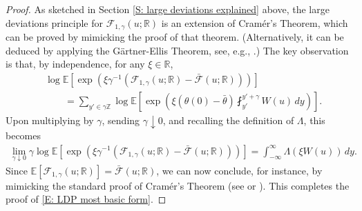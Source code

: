 \documentclass[10pt,a4paper]{amsart}
\newcommand{\E}{\mathbb{E}}
\begin{document}
		\begin{proof} As sketched in Section \ref{S: large deviations explained} above, the large deviations principle for $\mathscr{F}_{1,\gamma}(u;\mathbb{R})$ is an extension of Cram\'{e}r's Theorem, which can be proved by mimicking the proof of that theorem. (Alternatively, it can be deduced by applying the G\"{a}rtner-Ellis Theorem, see, e.g., \cite[Section 12.2]{Rassoul-Agha}.) The key observation is that, by independence, for any $\xi \in \mathbb{R}$,
        \begin{align*}
            & \log \mathbb{E} [ \exp ( \xi \gamma^{-1} ( \mathscr{F}_{1,\gamma}(u;\mathbb{R})  - \bar{\mathscr{F}}(u;\mathbb{R}))) ] \\
            & \qquad = \sum_{y' \in \gamma \mathbb{Z}} \log \mathbb{E} [ \exp ( \xi ( \theta(0) - \bar{\theta} ) \fint_{y'}^{y' + \gamma} W(u) \, dy ) ].
        \end{align*}
Upon multiplying by $\gamma$, sending $\gamma \downarrow 0$, and recalling the definition of $\Lambda$, this becomes
        \begin{align*}
        \lim_{ \gamma \downarrow 0 } \gamma  \log \mathbb{E} [ \exp ( \xi \gamma^{-1} ( \mathscr{F}_{1,\gamma}(u;\mathbb{R})  - \bar{\mathscr{F}}(u;\mathbb{R})) ) ] = \int_{-\infty}^{\infty} \Lambda ( \xi W(u) ) \, dy.
        \end{align*}
       Since $ \E [ \mathscr{F}_{ 1 , \gamma } ( u ; \mathbb{R} ) ] = \bar{\mathscr{F}}(u;\mathbb{R}) $, we can now conclude, for instance, by mimicking the standard proof of Cram\'{e}r's Theorem (see \cite[Section 5.11]{grimmett_stirzaker} or \cite[Section 2.4]{varadhan}). This completes the proof of \eqref{E: LDP most basic form}.
        

\end{proof}
\end{document}
